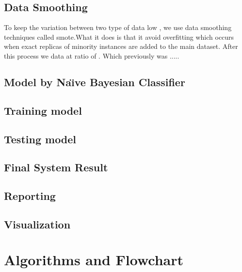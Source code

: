 \subsection{Data Smoothing}
To keep the variation between two type of data low , we use data smoothing techniques called \acs{smote}.What it does is that it avoid overfitting which occurs when exact replicas of minority instances are added to the main dataset. After this process we data at ratio of . Which previously was .....
\subsection{Model by Na\"{\i}ve Bayesian Classifier}
\subsection{Training model}
\subsection{Testing model}
\subsection{Final System Result}
\subsection{Reporting}
\subsection{Visualization}




\section{Algorithms and Flowchart}
